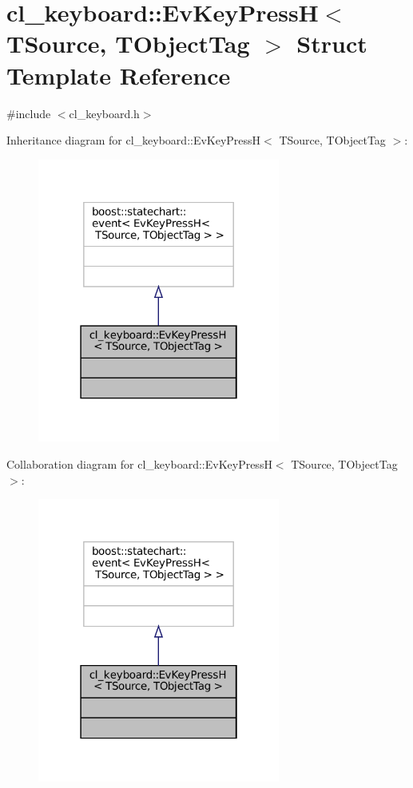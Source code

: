 \hypertarget{structcl__keyboard_1_1EvKeyPressH}{}\section{cl\+\_\+keyboard\+:\+:Ev\+Key\+PressH$<$ T\+Source, T\+Object\+Tag $>$ Struct Template Reference}
\label{structcl__keyboard_1_1EvKeyPressH}


{\ttfamily \#include $<$cl\+\_\+keyboard.\+h$>$}



Inheritance diagram for cl\+\_\+keyboard\+:\+:Ev\+Key\+PressH$<$ T\+Source, T\+Object\+Tag $>$\+:
\nopagebreak
\begin{figure}[H]
\begin{center}
\leavevmode
\includegraphics[width=226pt]{structcl__keyboard_1_1EvKeyPressH__inherit__graph}
\end{center}
\end{figure}


Collaboration diagram for cl\+\_\+keyboard\+:\+:Ev\+Key\+PressH$<$ T\+Source, T\+Object\+Tag $>$\+:
\nopagebreak
\begin{figure}[H]
\begin{center}
\leavevmode
\includegraphics[width=226pt]{structcl__keyboard_1_1EvKeyPressH__coll__graph}
\end{center}
\end{figure}


